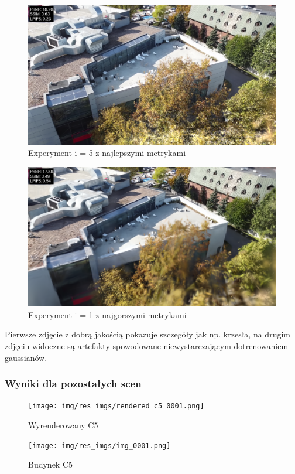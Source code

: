 \begin{figure}[!h]
    \centering
    \includegraphics[width=0.8\linewidth]{img/res_imgs/eval_with_metrics_0010_5.png}
    \caption{Experyment i = 5 z najlepszymi metrykami}\label{fig:eval_1}
\end{figure}

\begin{figure}[!h]
    \centering
    \includegraphics[width=0.8\linewidth]{img/res_imgs/eval_with_metrics_0010_1.png}
    \caption{Experyment i = 1 z najgorszymi metrykami}\label{fig:eval_5}
\end{figure}

Pierwsze zdjęcie z dobrą jakością pokazuje szczegóły jak np. krzesła, na drugim zdjęciu widoczne są artefakty spowodowane niewystarczającym dotrenowaniem gaussianów. 

\subsubsection{Wyniki dla pozostałych scen}

\begin{figure}[!h]
    \centering
    \texttt{[image: img/res\_imgs/rendered\_c5\_0001.png]}
    \caption{Wyrenderowany C5}\label{fig:c5_rend}
\end{figure}

\begin{figure}[!h]
    \centering
    \texttt{[image: img/res\_imgs/img\_0001.png]}
    \caption{Budynek C5}\label{fig:c5_gt}
\end{figure}

